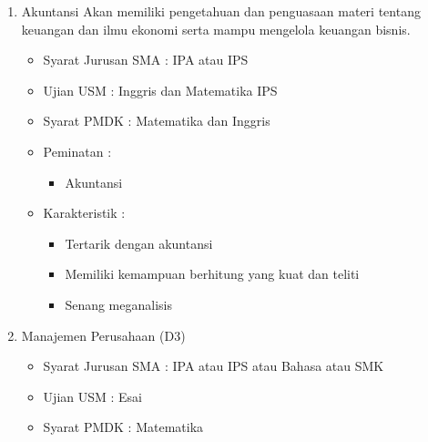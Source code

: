 \documentclass[a4paper,twoside]{article}
\begin{document}
\begin{enumerate}
\begin{enumerate}
\begin{enumerate}
				\item Akuntansi
					Akan memiliki pengetahuan dan penguasaan materi tentang keuangan dan ilmu ekonomi serta mampu mengelola keuangan bisnis.				
					\begin{itemize}
						\item Syarat Jurusan SMA : IPA atau IPS
						\item Ujian USM : Inggris dan Matematika IPS
						\item Syarat PMDK : Matematika dan Inggris
						\item Peminatan :
						\begin{itemize}
							\item Akuntansi 
						\end{itemize}
						\item Karakteristik :
						\begin{itemize}
							\item Tertarik dengan akuntansi
							\item Memiliki kemampuan berhitung yang kuat dan teliti
							\item Senang meganalisis
						\end{itemize}
					\end{itemize}
					
				\item Manajemen Perusahaan (D3)
				
					\begin{itemize}
						\item Syarat Jurusan SMA : IPA atau IPS atau Bahasa atau SMK
						\item Ujian USM : Esai
						\item Syarat PMDK : Matematika
					\end{itemize}
			\end{enumerate}
			

\end{enumerate}
\end{enumerate}
\end{document}
